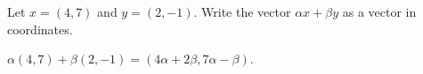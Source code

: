 \documentclass{ximera}
\begin{document}
\begin{exercise} \label{c4.3.2}
Let $x=(4,7)$ and $y=(2,-1)$.  Write the vector $\alpha x+\beta
y$ as a vector in coordinates.

\begin{solution}

$\alpha (4,7) + \beta (2,-1) = (4\alpha + 2\beta, 7\alpha - \beta)$.

\end{solution}
\end{exercise}
\end{document}
